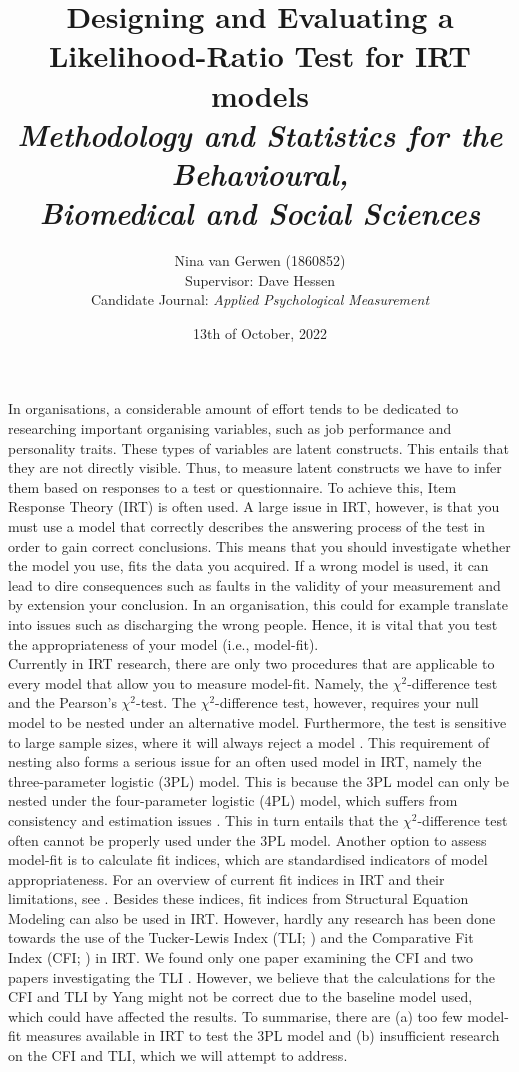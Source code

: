 \documentclass{article}
\title{%
	Designing and Evaluating a Likelihood-Ratio Test for IRT models \\
	\large \textit{Methodology and Statistics for the Behavioural, \\
	Biomedical and Social Sciences}}
\author{Nina van Gerwen (1860852) \\ 
	Supervisor: Dave Hessen \\ 
	\small {Candidate Journal: \textit{Applied Psychological Measurement}}}
\date{13th of October, 2022}
\begin{document}
\maketitle

\newpage

\section{}
\indent In organisations, a considerable amount of effort tends to be dedicated to researching important organising variables, such as job performance and personality traits. These types of variables are latent constructs. This entails that they are not directly visible. Thus, to measure latent constructs we have to infer them based on responses to a test or questionnaire. To achieve this, Item Response Theory (IRT) is often used. A large issue in IRT, however, is that you must use a model that correctly describes the answering process of the test in order to gain correct conclusions. This means that you should investigate whether the model you use, fits the data you acquired. If a wrong model is used, it can lead to dire consequences such as faults in the validity of your measurement \autocite{consq1, consq2, consq3} and by extension your conclusion. In an organisation, this could for example translate into issues such as discharging the wrong people. Hence, it is vital that you test the appropriateness of your model (i.e., model-fit). \\
\indent Currently in IRT research, there are only two procedures that are applicable to every model that allow you to measure model-fit. Namely, the $\chi^2$-difference test and the Pearson's $\chi^2$-test. The $\chi^2$-difference test, however, requires your null model to be nested under an alternative model. Furthermore, the test is sensitive to large sample sizes, where it will always reject a model \autocite{chi2sens}. This requirement of nesting also forms a serious issue for an often used model in IRT, namely the three-parameter logistic (3PL) model. This is because the 3PL model can only be nested under the four-parameter logistic (4PL) model, which suffers from consistency and estimation issues \autocite{4plconsist1, 4plconsist2}. This in turn entails that the $\chi^2$-difference test often cannot be properly used under the 3PL model. Another option to assess model-fit is to calculate fit indices, which are standardised indicators of model appropriateness. For an overview of current fit indices in IRT and their limitations, see \textcite{ref1}. Besides these indices, fit indices from Structural Equation Modeling can also be used in IRT. However, hardly any research has been done towards the use of the Tucker-Lewis Index (TLI; \cite{tli}) and the Comparative Fit Index (CFI; \cite{cfi}) in IRT. We found only one paper examining the CFI \autocite{yangfitindex} and two papers investigating the TLI \autocite{yangfitindex, tliirt}. However, we believe that the calculations for the CFI and TLI by Yang might not be correct due to the baseline model used, which could have affected the results. To summarise, there are (a) too few model-fit measures available in IRT to test the 3PL model and (b) insufficient research on the CFI and TLI, which we will attempt to address. \\
\end{document}
